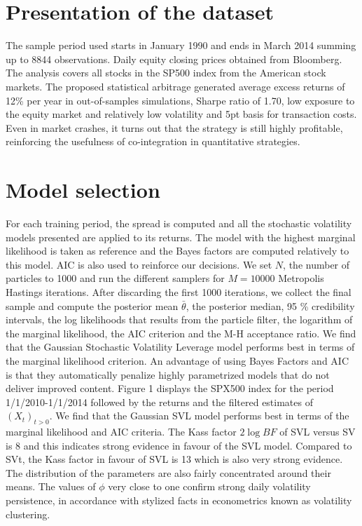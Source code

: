 \documentclass[11pt,a4,twosided,singlespacing,titlepagenumber=on]{scrreprt}
\numberwithin{equation}{chapter} %
\theoremstyle{remark}
\begin{document}
\section{Presentation of the dataset}
The sample period used starts in January 1990 and ends in March 2014 summing up to 8844 observations. Daily equity closing prices obtained from Bloomberg. The analysis covers all stocks in the SP500 index from the American stock markets. The proposed statistical arbitrage generated average excess returns of 12\% per year in out-of-samples simulations, Sharpe ratio of 1.70, low exposure to the equity market and relatively low volatility and 5pt basis for transaction costs. Even in market crashes, it turns out that the strategy is still highly profitable, reinforcing the usefulness of co-integration in quantitative strategies.

\section{Model selection}
For each training period, the spread is computed and all the stochastic volatility models presented are applied to its returns. The model with the highest marginal likelihood is taken as reference and the Bayes factors are computed relatively to this model. AIC is also used to reinforce our decisions. We set $N$, the number of particles to 1000 and run the different samplers for $M = 10000$ Metropolis Hastings iterations. After discarding the first 1000 iterations, we collect the final sample and compute the posterior mean $\bar{\theta}$, the posterior median, 95 \% credibility intervals, the log likelihoods that results from the particle filter, the logarithm of the marginal likelihood, the AIC criterion and the M-H acceptance ratio. We find that the Gaussian Stochastic Volatility Leverage model performs best in terms of the marginal likelihood criterion. An advantage of using Bayes Factors and AIC is that they automatically penalize highly parametrized models that do not deliver improved content. Figure 1 displays the SPX500 index for the period 1/1/2010-1/1/2014 followed by the returns and the filtered estimates of $(X_t)_{t>0}$.
We find that the Gaussian SVL model performs best in terms of the marginal likelihood and AIC criteria. The Kass factor $2 \log BF$ of SVL versus SV is 8 and this indicates strong evidence in favour of the SVL model. Compared to SVt, the Kass factor in favour of SVL is 13 which is also very strong evidence. The distribution of the parameters are also fairly concentrated around their means. The values of $\phi$ very close to one confirm strong daily volatility persistence, in accordance with stylized facts in econometrics known as volatility clustering.
\end{document}
